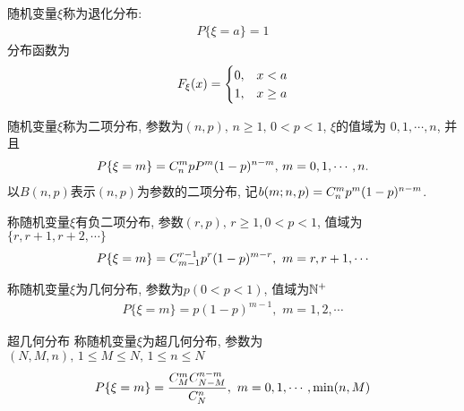 \begin{degrade_distru}[退化分布]
随机变量\(\xi\)称为退化分布:
\begin{align}
P\{\xi = a\} = 1
\end{align}
分布函数为
\begin{align}
F_{\xi}(x) = \begin{cases} 0, & x<a\cr 1, & x\ge a\cr\end{cases}
\end{align}
\end{degrade_distru}

\begin{binomial_distru}[二项分布]
随机变量\(\xi\)称为二项分布, 参数为\((n, p),\, n\ge 1,\, 0<p<1\), \(\xi\)的值域为 \(0, 1, \cdots, n\), 并且
\begin{align}
P\{\xi = m\} = C_{n}^{m}pP^{m}(1-p)^{n-m},\, m = 0,1,\cdots, n.
\end{align}
以\(B(n, p)\)表示\((n,p)\)为参数的二项分布, 记\(b(m;n, p) = C_{n}^{m}p^{m}(1-p)^{n-m}\).
\end{binomial_distru}

\begin{negative_binomial_distru}[负二项分布]
称随机变量\(\xi\)有负二项分布, 参数\((r, p),\,r\ge 1, 0<p<1\), 值域为\(\{r, r+1, r+2, \cdots\}\)
\begin{align}
P\{\xi = m\} = C_{m-1}^{r-1}p^{r}(1-p)^{m-r},\,\, m = r, r+1, \cdots
\end{align}
\end{negative_binomial_distru}

\begin{geometry_distru}[几何分布]
称随机变量\(\xi\)为几何分布, 参数为\(p(0<p<1)\), 值域为\(\Ns^+\)
\begin{align}
P\{\xi = m\} = p(1-p)^{m-1},\,\, m = 1, 2, \cdots
\end{align}
\end{geometry_distru}

\begin{super_geometry_distru}{超几何分布}
称随机变量\(\xi\)为超几何分布, 参数为\((N, M, n),\,1\le M\le N,\,1\le n\le N\)
\begin{align}
P\{\xi = m\} = {C_{M}^{m}C_{N-M}^{n-m}\over C_{N}^{n}},\,\, m =0, 1, \cdots, \min(n, M)
\end{align}
\end{super_geometry_distru}

